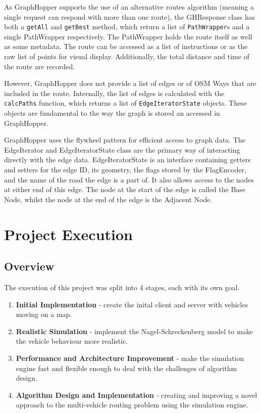 \documentclass[ %
                    author={Alexander Hill},
                supervisor={Dr. Benjamin Sach},
                    degree={MEng},
                     title={MARMOSET},
                  subtitle={Multi-Agent Route Management using Online Simulation for Efficient Transportation},
                      type={research},
                      year={2016} ]{dissertation}
\begin{document}
As GraphHopper supports the use of an alternative routes algorithm (meaning a
single request can respond with more than one route), the GHResponse class has
both a \texttt{getAll} and \texttt{getBest} method, which return a list of
\texttt{PathWrapper}s and a single PathWrapper respectively. The PathWrapper
holds the route itself as well as some metadata. The route can be accessed as a
list of instructions or as the raw list of points for visual display.
Additionally, the total distance and time of the route are recorded.

However, GraphHopper does not provide a list of edges or of OSM Ways that are
included in the route. Internally, the list of edges is calculated with the
\texttt{calcPaths} function, which returns a list of \texttt{EdgeIteratorState}
objects. These objects are fundamental to the way the graph is stored an
accessed in GraphHopper.

GraphHopper uses the flywheel pattern for efficient access to graph data. The
EdgeIterator and EdgeIteratorState class are the primary way of interacting
directly with the edge data. EdgeIteratorState is an interface containing
getters and setters for the edge ID, its geometry, the flags stored by the
FlagEncoder, and the name of the road the edge is a part of. It also allows
access to the nodes at either end of this edge. The node at the start of the
edge is called the Base Node, whilst the node at the end of the edge is the
Adjacent Node.


\chapter{Project Execution}
\label{chap:execution}


\section{Overview}

The execution of this project was split into 4 stages, each with its own goal.

\begin{enumerate}
    \item \textbf{Initial Implementation} - create the inital client and
        server with vehicles moving on a map.
    \item \textbf{Realistic Simulation} - implement the Nagel-Schreckenberg
        model to make the vehicle behaviour more realistic.
    \item \textbf{Performance and Architecture Improvement} - make the
        simulation engine fast and flexible enough to deal with the challenges
        of algorithm design.
    \item \textbf{Algorithm Design and Implementation} - creating and improving
        a novel approach to the multi-vehicle routing problem using the
        simulation engine.
\end{enumerate}
\end{document}
